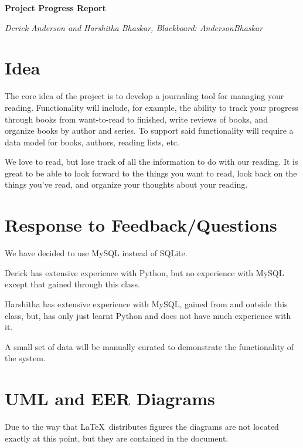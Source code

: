 \documentclass{article}
\begin{document}

\begin{center}
  \textbf{Project Progress Report}

  \textit{Derick Anderson and Harshitha Bhaskar, Blackboard: AndersonBhaskar}
\end{center}

\section*{Idea}

The core idea of the project is to develop a journaling tool for managing your
reading. Functionality will include, for example, the ability to track your
progress through books from want-to-read to finished, write reviews of books,
and organize books by author and series. To support said functionality will
require a data model for books, authors, reading lists, etc.

We love to read, but lose track of all the information to do with our
reading. It is great to be able to look forward to the things you want to read,
look back on the things you’ve read, and organize your thoughts about your
reading.

\section*{Response to Feedback/Questions}

We have decided to use MySQL instead of SQLite.

Derick has extensive experience with Python,
but no experience with MySQL
except that gained through this class.

Harshitha has extensive experience with MySQL, gained from and outside this class, 
but, has only just learnt Python and does not have much experience with it.

A small set of data will be manually curated to demonstrate the functionality of
the system.

\section*{UML and EER Diagrams}

Due to the way that \LaTeX \ distributes figures
the diagrams are not located exactly at this point,
but they are contained in the document.
\end{document}
